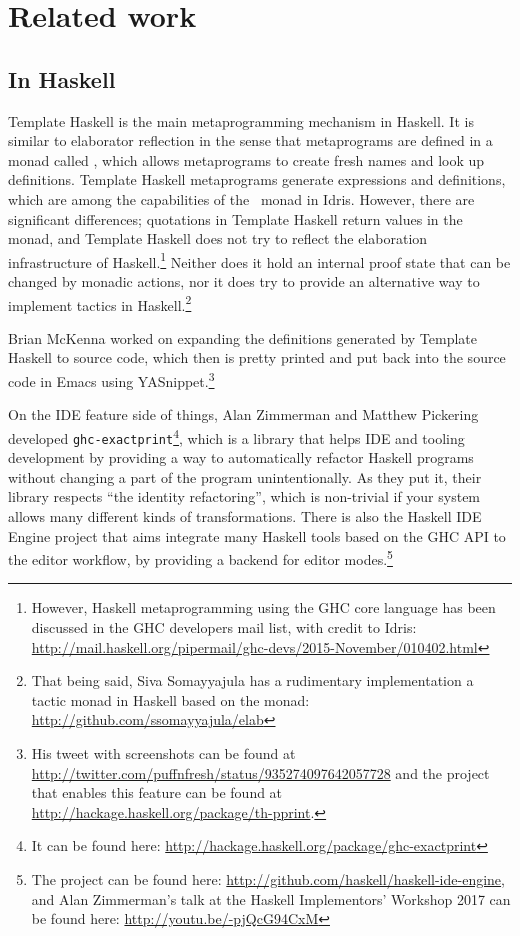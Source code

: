 \chapter{Related work} \label{chap:relatedwork}

\section{In Haskell}

Template Haskell \cite{th} is the main metaprogramming mechanism in Haskell.
It is similar to elaborator reflection in the sense that metaprograms are
defined in a monad called , which allows metaprograms to create fresh
names and look up definitions.
Template Haskell metaprograms generate expressions and definitions, which are
among the capabilities of the \Elab\ monad in Idris.
However, there are significant differences;
quotations in Template Haskell return values in the  monad, and Template
Haskell does not try to reflect the elaboration infrastructure of
Haskell.\footnote{However, Haskell metaprogramming using the GHC core language
has been discussed in the GHC developers mail list, with credit to Idris:
\url{http://mail.haskell.org/pipermail/ghc-devs/2015-November/010402.html}}
Neither does it hold an internal proof state that can be changed by monadic
actions, nor it does try to provide an alternative way to implement tactics in
Haskell.\footnote{That being said, Siva Somayyajula has a rudimentary
implementation a tactic monad in Haskell based on the  monad:
\url{http://github.com/ssomayyajula/elab}}

Brian McKenna worked on expanding the definitions generated by Template Haskell
to source code, which then is pretty printed and put back into the source code
in Emacs using YASnippet.\footnote{His tweet with screenshots can be found at
\url{http://twitter.com/puffnfresh/status/935274097642057728} and the project
that enables this feature can be found at
\url{http://hackage.haskell.org/package/th-pprint}.}

On the IDE feature side of things, Alan Zimmerman and Matthew Pickering
developed \texttt{ghc-exactprint}\footnote{It can be found here:
\url{http://hackage.haskell.org/package/ghc-exactprint}}, which is a library
that helps IDE and tooling development by providing a way to automatically
refactor Haskell programs without changing a part of the program
unintentionally. As they put it, their library respects ``the identity
refactoring'', which is non-trivial if your system allows many different kinds
of transformations.\cite{ghc-exactprint-blog}
There is also the Haskell IDE Engine project that aims integrate many Haskell
tools based on the GHC API to the editor workflow, by providing a backend for
editor modes.\footnote{The project can be found here:
\url{http://github.com/haskell/haskell-ide-engine}, and Alan Zimmerman's talk
at the Haskell Implementors' Workshop 2017 can be found here:
\url{http://youtu.be/-pjQcG94CxM}}

